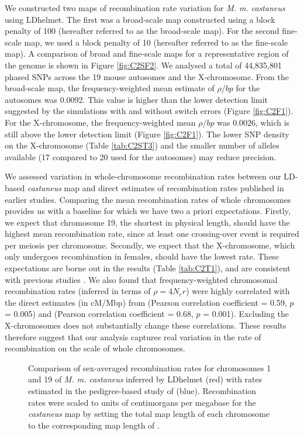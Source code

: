 We constructed two maps of recombination rate variation for \textit{M. m. castaneus} using LDhelmet. The first was a broad-scale map constructed using a block penalty of 100 (hereafter referred to as the broad-scale map). For the second fine-scale map, we used a block penalty of 10 (hereafter referred to as the fine-scale map). A comparison of broad and fine-scale maps for a representative region of the genome is shown in Figure \ref{fig:C2SF2}. We analysed a total of 44,835,801 phased SNPs across the 19 mouse autosomes and the X-chromosome. From the broad-scale map, the frequency-weighted mean estimate of $\rho /bp$ for the autosomes was 0.0092. This value is higher than the lower detection limit suggested by the simulations with and without switch errors (Figure \ref{fig:C2F1}). For the X-chromosome, the frequency-weighted mean $\rho /bp$ was 0.0026, which is still above the lower detection limit (Figure \ref{fig:C2F1}). The lower SNP density on the X-chromosome (Table \ref{tab:C2ST3}) and the smaller number of alleles available (17 compared to 20 used for the autosomes) may reduce precision. 
 
We assessed variation in whole-chromosome recombination rates between our LD-based \textit{castaneus} map and direct estimates of recombination rates published in earlier studies. Comparing the mean recombination rates of whole chromosomes provides us with a baseline for which we have two a priori expectations. Firstly, we expect that chromosome 19, the shortest in physical length, should have the highest mean recombination rate, since at least one crossing-over event is required per meiosis per chromosome. Secondly, we expect that the X-chromosome, which only undergoes recombination in females, should have the lowest rate. These expectations are borne out in the results (Table \ref{tab:C2T1}), and are consistent with previous studies \citep{RN184, RN232}. We also found that frequency-weighted chromosomal recombination rates (inferred in terms of $\rho = 4N_er$) were highly correlated with the direct estimates (in cM/Mbp) from \cite{RN184} (Pearson correlation coefficient = 0.59, $p$ = 0.005) and \cite{RN232} (Pearson correlation coefficient = 0.68, $p$ = 0.001). Excluding the X-chromosomes does not substantially change these correlations. These results therefore suggest that our analysis captures real variation in the rate of recombination on the scale of whole chromosomes. 


\begin{figure}[h]
   \centering      
   \noindent{}
 \caption[Comparison of LD-based and pedigree-based recombination maps]{Comparison of sex-averaged recombination rates for chromosomes 1 and 19 of \emph{M. m. castaneus} inferred by LDhelmet (red) with rates estimated in the pedigree-based study of \cite{RN232} (blue). Recombination rates were scaled to units of centimorgans per megabase for the \textit{castaneus} map by setting the total map length of each chromosome to the corresponding map length of \cite{RN232}.}
\label{fig:C2F2}

\end{figure}


